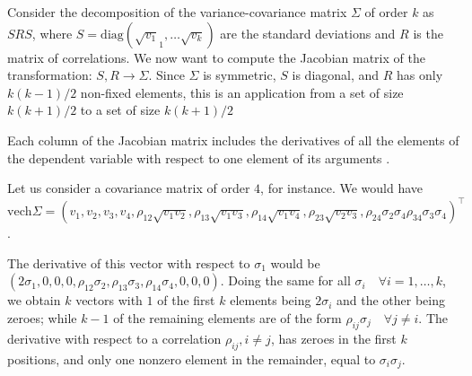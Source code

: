 \documentclass{article}
\begin{document}
Consider the decomposition of the variance-covariance matrix $\Sigma$ of order $k$ as $SRS$, where $S = \mathrm{diag}(\sqrt{v_1}_1, \dots \sqrt{v_k})$ are the standard deviations and $R$ is the matrix of correlations. We now want to compute the Jacobian matrix of the transformation: $S, R \rightarrow \Sigma$. 
Since $\Sigma$ is symmetric, $S$ is diagonal, and $R$ has only $k(k-1)/2$ non-fixed elements, this is an application from a set of size $k(k+1)/2$ to a set of size $k(k+1)/2$

Each column of the Jacobian matrix includes the derivatives of all the elements of the dependent variable with respect to one element of its arguments \cite{Magnus}. 

Let us consider a covariance matrix of order $4$, for instance. We would have $\mathrm{vech} \Sigma = (v_1, v_2, v_3, v_4, \rho_{12} \sqrt{v_1 v_2} , \rho_{13} \sqrt{v_1 v_3}, \rho_{14} \sqrt{v_1 v_4}, \rho_{23} \sqrt{v_2 v_3}, \rho_{24} \sigma_2 \sigma_4 \rho_{34} \sigma_3 \sigma_4   )^\top$. 

The derivative of this vector with respect to $\sigma_1$ would be $(2 \sigma_1, 0,0,0, \rho_{12} \sigma_2, \rho_{13} \sigma_3, \rho_{14} \sigma_4, 0, 0, 0)$. Doing the same for all $\sigma_i \quad \forall i = 1, \dots, k$, we obtain $k$ vectors with $1$ of the first $k$ elements being $2 \sigma_i$ and the other being zeroes; while $k-1$ of the remaining elements are of the form $\rho_{ij} \sigma_j \quad \forall j \neq i$. 
The derivative with respect to a correlation $\rho_{ij}, i \neq j$, has zeroes in the first $k$ positions, and only one nonzero element in the remainder, equal to $\sigma_i \sigma_j$. 
\end{document}
